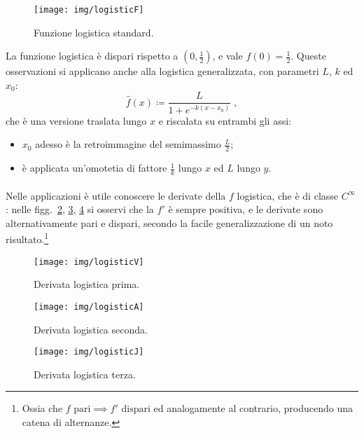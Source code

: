 \begin{figure}[pbh]
    \centering
    \texttt{[image: img/logisticF]}

    \caption[Funzione logistica]{Funzione logistica standard.}
    \label{img:logisticF}
\end{figure}

La funzione logistica è dispari rispetto a $(0, \frac{1}{2})$, e vale $f(0) = \frac{1}{2}$.
Queste osservazioni si applicano anche alla logistica generalizzata, con parametri $L$, $k$ ed $x_0$:
\begin{equation}
    \hat{f}(x) \coloneq \frac{L}{1+e^{-k(x -x_0)}} \; ,
    \label{eq:logisticFgen}
\end{equation}
che è una versione traslata lungo $x$ e riscalata su entrambi gli assi:
\begin{itemize}
    \item $x_0$ adesso è la retroimmagine del semimassimo $\frac{L}{2}$;
    \item è applicata un'omotetia di fattore $\frac{1}{k}$ lungo $x$ ed $L$ lungo $y$.
\end{itemize}

\paragraph{}
Nelle applicazioni è utile conoscere le derivate della $f$ logistica, che è di classe $C^{\infty}$:
nelle figg.~\ref{img:logisticV}, \ref{img:logisticA}, \ref{img:logisticJ} si osservi che
la $f'$ è sempre positiva, e le derivate sono alternativamente pari e dispari, secondo la
facile generalizzazione di un noto risultato.\footnote{Ossia che $f \text{ pari} \implies
    f' \text{ dispari}$ ed analogamente al contrario,
producendo una catena di alternanze.}

\begin{figure}[pbh]
    \centering
    \texttt{[image: img/logisticV]}

    \caption{Derivata logistica prima.}
    \label{img:logisticV}
\end{figure}
\begin{figure}[pbh]
    \centering
    \texttt{[image: img/logisticA]}

    \caption{Derivata logistica seconda.}
    \label{img:logisticA}
\end{figure}
\begin{figure}[pbh]
    \centering
    \texttt{[image: img/logisticJ]}

    \caption{Derivata logistica terza.}
    \label{img:logisticJ}
\end{figure}

